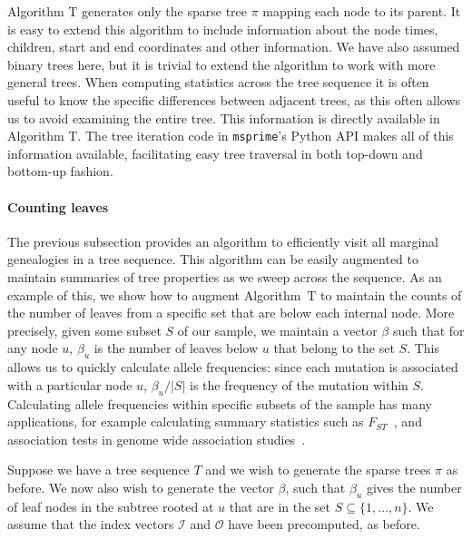 \documentclass[10pt,letterpaper]{article}
\newcommand{\indexin}[0]{\ensuremath{\mathcal{I}}}
\newcommand{\indexout}[0]{\ensuremath{\mathcal{O}}}
\newcommand{\msprime}[0]{\texttt{msprime}}
\begin{document}
Algorithm T generates only the sparse tree $\pi$ mapping each node to its
parent. It is easy to extend this algorithm to include information about the
node times, children, start and end coordinates and other information. We have
also assumed binary trees here, but it is trivial to extend the algorithm  to work
with more general trees.  When computing statistics across the tree sequence it
is often useful to know the specific differences between adjacent trees, as
this often allows us to avoid examining the entire tree. This information is
directly available in Algorithm T.  The tree iteration code in \msprime's
Python API makes all of this information available, facilitating easy tree
traversal in both top-down and bottom-up fashion.

\paragraph*{Counting leaves}
\label{sec-counting-leaves}

The previous subsection provides an algorithm to efficiently visit
all marginal genealogies in a tree sequence. This algorithm can be easily
augmented to maintain summaries of tree properties as we sweep across the
sequence. As an example of this, we show how to augment Algorithm~T to maintain
the counts of the number of leaves from a specific set that are below each
internal node. More precisely, given some subset $S$ of our sample, we
maintain a vector $\beta$ such that for any node $u$, $\beta_u$
is the number of leaves below $u$ that belong to the set $S$.
This allows us to
quickly calculate allele frequencies: since each mutation is associated
with a particular node $u$, $\beta_u / |S|$  is the frequency of the
mutation within $S$. Calculating allele frequencies within specific
subsets of the sample has many applications, for example calculating
summary statistics such as $F_{ST}$~\citep{cc10}, and association
tests in genome wide association studies~\citep{ssdm09}.

Suppose we have a tree sequence $T$ and we wish to generate
the sparse trees $\pi$ as before. We now also wish to generate the
vector $\beta$, such that $\beta_u$ gives the number of leaf nodes
in the subtree rooted at $u$ that are in the set $S \subseteq
\{1, \dots, n\}$. We assume that the index vectors $\indexin$ and
$\indexout$ have been precomputed, as before.
\end{document}
